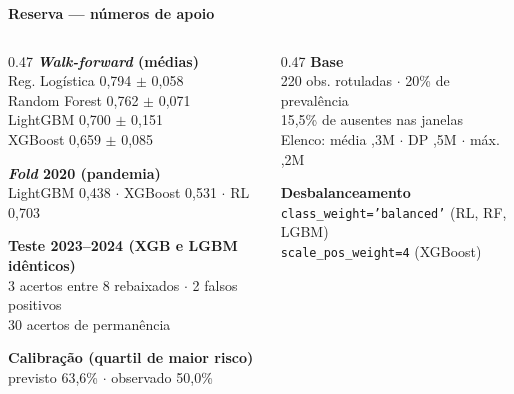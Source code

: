 \documentclass[aspectratio=169,11pt,t]{beamer}
\providecommand{\euro}{\texteuro}
\begin{document}
{
\begin{frame}[plain]
    \vspace{0.3cm}
    {\small\color{tinta2}\textbf{Reserva --- números de apoio}}

    \vspace{0.3cm}
    \scriptsize
    \begin{columns}[t]
        \begin{column}{0.47\textwidth}
            \textbf{\emph{Walk-forward} (médias)}\\
            Reg. Logística 0,794 $\pm$ 0,058\\
            Random Forest 0,762 $\pm$ 0,071\\
            LightGBM 0,700 $\pm$ 0,151\\
            XGBoost 0,659 $\pm$ 0,085

            \vspace{0.3cm}
            \textbf{\emph{Fold} 2020 (pandemia)}\\
            LightGBM 0,438 $\cdot$ XGBoost 0,531 $\cdot$ RL 0,703

            \vspace{0.3cm}
            \textbf{Teste 2023--2024 (XGB e LGBM idênticos)}\\
            3 acertos entre 8 rebaixados $\cdot$ 2 falsos positivos\\
            30 acertos de permanência

            \vspace{0.3cm}
            \textbf{Calibração (quartil de maior risco)}\\
            previsto 63,6\% $\cdot$ observado 50,0\%
        \end{column}
        \begin{column}{0.47\textwidth}
            \textbf{Base}\\
            220 obs. rotuladas $\cdot$ 20\% de prevalência\\
            15,5\% de ausentes nas janelas\\
            Elenco: média \euro55,3M $\cdot$ DP \euro38,5M $\cdot$ máx. \euro214,2M

            \vspace{0.3cm}
            \textbf{Desbalanceamento}\\
            \texttt{class\_weight='balanced'} (RL, RF, LGBM)\\
            \texttt{scale\_pos\_weight=4} (XGBoost)


\end{column}
\end{columns}
\end{frame}}
\end{document}
